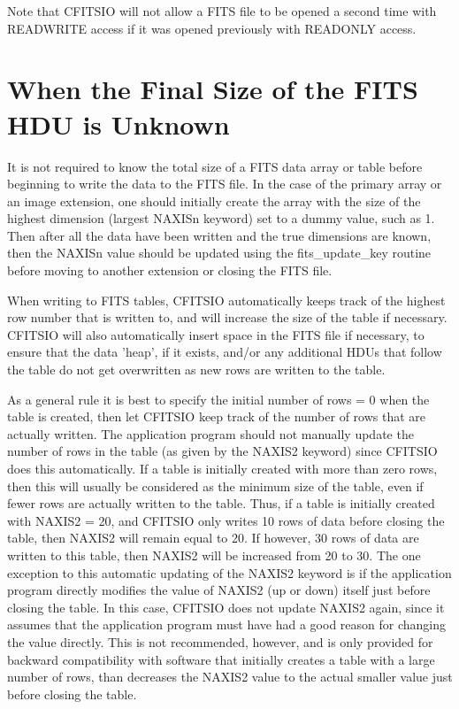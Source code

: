 \documentclass[11pt]{book}
\begin{document}
\begin{itemize}
Note that CFITSIO will not allow a FITS file to be opened a second
time with READWRITE access if it was opened previously with READONLY
access.

\end{itemize}


\section{When the Final Size of the FITS HDU is Unknown}

It is not required to know the total size of a FITS data array or table
before beginning to write the data to the FITS file.  In the case of
the primary array or an image extension, one should initially create
the array with the size of the highest dimension (largest NAXISn
keyword) set to a dummy value, such as 1.  Then after all the data have
been written and the true dimensions are known, then the NAXISn value
should be updated using the fits\_update\_key routine before moving to
another extension or closing the FITS file.

When writing to FITS tables, CFITSIO automatically keeps track of the
highest row number that is written to, and will increase the size of
the table if necessary.  CFITSIO will also automatically insert space
in the FITS file if necessary, to ensure that the data 'heap', if it
exists, and/or any additional HDUs that follow the table do not get
overwritten as new rows are written to the table.

As a general rule it is best to specify the initial number of rows = 0
when the table is created, then let CFITSIO keep track of the number of
rows that are actually written.  The application program should not
manually update the number of rows in the table (as given by the NAXIS2
keyword) since CFITSIO does this automatically.  If a table is
initially created with more than zero rows, then this will usually be
considered as the minimum size of the table, even if fewer rows are
actually written to the table.  Thus, if a table is initially created
with NAXIS2 = 20, and CFITSIO only writes 10 rows of data before
closing the table, then NAXIS2 will remain equal to 20.  If however, 30
rows of data are written to this table, then NAXIS2 will be increased
from 20 to 30.  The one exception to this automatic updating of the
NAXIS2 keyword is if the application program directly modifies the
value of NAXIS2 (up or down) itself just before closing the table.  In this
case, CFITSIO does not update NAXIS2 again, since it assumes that the
application program must have had a good reason for changing the value
directly.  This is not recommended, however, and is only provided for
backward compatibility with software that initially creates a table
with a large number of rows, than decreases the NAXIS2 value to the
actual smaller value just before closing the table.
\end{document}
